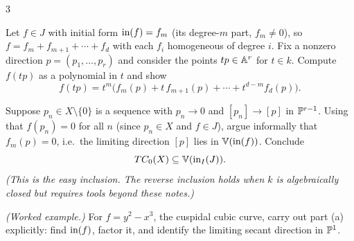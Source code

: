 \documentclass[12pt]{article}
\begin{document}

\begin{problem}{3}
    \begin{enumalph}
        \item Let $f \in J$ with initial form $\init(f) = f_m$ (its degree-$m$ part, $f_m \neq 0$), so $f = f_m + f_{m+1} + \cdots + f_d$ with each $f_i$ homogeneous of degree $i$. Fix a nonzero direction $p = (p_1, \ldots, p_r)$ and consider the points $tp \in \A^r$ for $t \in k$. Compute $f(tp)$ as a polynomial in $t$ and show \[f(tp) = t^m\big(f_m(p) + t\, f_{m+1}(p) + \cdots + t^{d-m} f_d(p)\big).\]

        \item Suppose $p_n \in X \setminus \{0\}$ is a sequence with $p_n \to 0$ 
        and $[p_n] \to [p]$ in $\P^{r-1}$. Using that $f(p_n) = 0$ for all $n$ 
        (since $p_n \in X$ and $f \in J$), argue informally that $f_m(p) = 0$, 
        i.e.\ the limiting direction $[p]$ lies in $\V(\init(f))$. Conclude 
        \[TC_0(X) \subseteq \V(\init_I(J)).\]
        \emph{(This is the easy inclusion. The reverse inclusion holds when $k$ 
        is algebraically closed but requires tools beyond these notes.)}

        \item \emph{(Worked example.)} For $f = y^2 - x^3$, the cuspidal cubic curve, carry out part (a) explicitly: find $\init(f)$, factor it, and identify the limiting secant direction in $\P^1$.
    \end{enumalph}
\end{problem}

        
        
\end{document}
